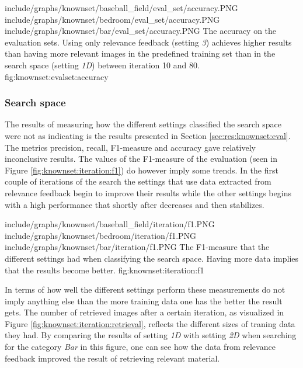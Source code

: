 \tripfigure
{include/graphs/knownset/baseball_field/eval_set/accuracy.PNG}
{include/graphs/knownset/bedroom/eval_set/accuracy.PNG}
{include/graphs/knownset/bar/eval_set/accuracy.PNG}
{The accuracy on the evaluation sets. Using only relevance feedback (setting \emph{3}) achieves higher results than having more relevant images in the predefined training set than in the search space (setting \emph{1D}) between iteration 10 and 80.}
{fig:knownset:evalset:accuracy}

\subsubsection{Search space}
\label{sec:res:knownset:iter}

The results of measuring how the different settings classified the search space were not as indicating is the results presented in Section \ref{sec:res:knownset:eval}. 
The metrics precision, recall, F1-measure and accuracy gave relatively inconclusive results. The values of the F1-measure of the evaluation (seen in Figure \ref{fig:knownset:iteration:f1}) do however imply some trends. In the first couple of iterations of the search the settings that use data extracted from relevance feedback begin to improve their results while the other settings begins with a high performance that shortly after decreases and then stabilizes.  

\tripfigurenear
{include/graphs/knownset/baseball_field/iteration/f1.PNG}
{include/graphs/knownset/bedroom/iteration/f1.PNG}
{include/graphs/knownset/bar/iteration/f1.PNG}
{The F1-measure that the different settings had when classifying the search space. Having more data implies that the results become better.}
{fig:knownset:iteration:f1}

In terms of how well the different settings perform these measurements do not imply anything else than the more training data one has the better the result gets. The number of retrieved images after a certain iteration, as visualized in Figure \ref{fig:knownset:iteration:retrieval}, reflects the different sizes of traning data they had. By comparing the results of setting \emph{1D} with setting \emph{2D} when searching for the category \emph{Bar} in this figure, one can see how the data from relevance feedback improved the result of retrieving relevant material.

